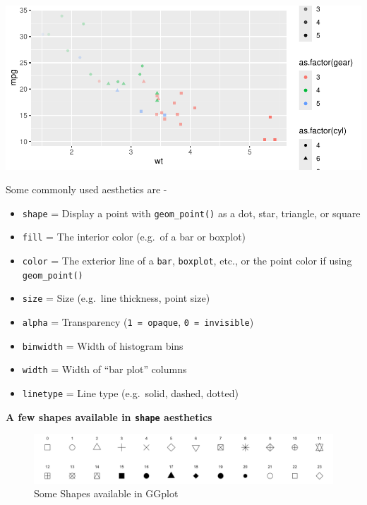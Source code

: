 \documentclass[
]{book}
\providecommand{\tightlist}{%
  \setlength{\itemsep}{0pt}\setlength{\parskip}{0pt}}
\begin{document}
\begin{center}\includegraphics{DauR_files/figure-latex/fig_10-1} \end{center}

Some commonly used aesthetics are -

\begin{itemize}
\tightlist
\item
  \texttt{shape} = Display a point with \texttt{geom\_point()} as a dot, star, triangle, or square
\item
  \texttt{fill} = The interior color (e.g.~of a bar or boxplot)
\item
  \texttt{color} = The exterior line of a \texttt{bar}, \texttt{boxplot}, etc., or the point color if using \texttt{geom\_point()}
\item
  \texttt{size} = Size (e.g.~line thickness, point size)
\item
  \texttt{alpha} = Transparency (\texttt{1\ =\ opaque}, \texttt{0\ =\ invisible})
\item
  \texttt{binwidth} = Width of histogram bins
\item
  \texttt{width} = Width of ``bar plot'' columns
\item
  \texttt{linetype} = Line type (e.g.~solid, dashed, dotted)
\end{itemize}

\textbf{A few shapes available in \texttt{shape} aesthetics}

\begin{figure}

{\centering \includegraphics[width=0.99\linewidth]{shapes} 

}

\caption{Some Shapes available in GGplot}\label{fig:shapes}
\end{figure}
\end{document}
